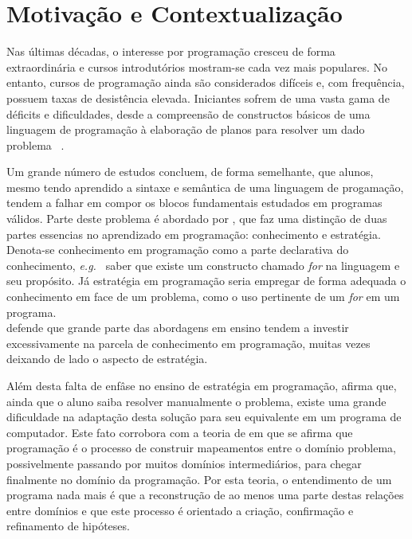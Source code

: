 \section{Motivação e Contextualização}
Nas últimas décadas, o interesse por programação cresceu de forma extraordinária 
e cursos introdutórios mostram-se cada vez mais populares. No entanto, 
cursos de programação ainda são considerados difíceis e, com frequência,
possuem taxas de desistência elevada. Iniciantes sofrem de uma 
vasta gama de déficits e dificuldades, desde a compreensão de constructos 
básicos de uma linguagem de programação à elaboração de planos
para resolver um dado problema \ \cite{robins2003learning}.

Um grande número de estudos concluem, de forma semelhante, que alunos, 
mesmo tendo aprendido a sintaxe e semântica de uma linguagem 
de progamação, tendem a falhar em compor os blocos fundamentais 
estudados em programas  válidos. Parte deste problema é abordado por 
, que faz uma distinção de duas partes 
essencias no aprendizado em programação: 
conhecimento e estratégia. Denota-se conhecimento em programação como a parte declarativa 
do conhecimento, \emph{e.g.\ } saber que existe um constructo chamado \emph{for} na linguagem 
e seu propósito. Já estratégia em programação seria empregar de forma adequada o conhecimento 
em face de um problema, como o uso pertinente de um \emph{for} em um programa.\\
 defende que grande parte das abordagens em ensino 
tendem a investir excessivamente na parcela de conhecimento em programação, muitas 
vezes deixando de lado o aspecto de estratégia.

Além desta falta de enfâse no ensino de estratégia em programação,
 afirma que, ainda que o aluno saiba resolver 
manualmente o problema,
existe uma grande dificuldade na adaptação 
desta solução para seu equivalente em um programa de computador. Este fato 
corrobora com a teoria de  em que se afirma que programação 
é o processo de construir mapeamentos entre o domínio problema, possivelmente passando 
por muitos domínios intermediários, para chegar finalmente no domínio da programação. 
Por esta teoria, o entendimento de um programa nada mais é que a reconstrução de 
ao menos uma parte destas relações entre domínios e que este processo é orientado 
a criação, confirmação e refinamento de hipóteses.

